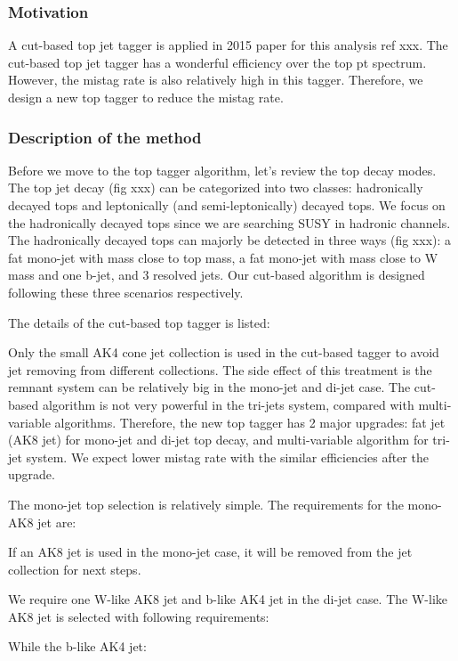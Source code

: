 \subsubsection{Motivation}
A cut-based top jet tagger is applied in 2015 paper for this analysis ref xxx. The cut-based top jet tagger has a wonderful efficiency over the top pt spectrum. However, the mistag rate is also relatively high in this tagger. Therefore, we design a new top tagger to reduce the mistag rate. 

\subsubsection{Description of the method}

Before we move to the top tagger algorithm, let’s review the top decay modes. The top jet decay (fig xxx) can be categorized into two classes: hadronically decayed tops and leptonically (and semi-leptonically) decayed tops. We focus on the hadronically decayed tops since we are searching SUSY in hadronic channels. The hadronically decayed tops can majorly be detected in three ways (fig xxx): a fat mono-jet with mass close to top mass, a fat mono-jet with mass close to W mass and one b-jet, and 3 resolved jets. Our cut-based algorithm is designed following these three scenarios respectively. 

The details of the cut-based top tagger is listed:

Only the small AK4 cone jet collection is used in the cut-based tagger to avoid jet removing from different collections. The side effect of this treatment is the remnant system can be relatively big in the mono-jet and di-jet case. The cut-based algorithm is not very powerful in the tri-jets system, compared with multi-variable algorithms. Therefore, the new top tagger has 2 major upgrades: fat jet (AK8 jet) for mono-jet and di-jet top decay, and multi-variable algorithm for tri-jet system. We expect lower mistag rate with the similar efficiencies after the upgrade. 

The mono-jet top selection is relatively simple. The requirements for the mono-AK8 jet are:


If an AK8 jet is used in the mono-jet case, it will be removed from the jet collection for next steps. 

We require one W-like AK8 jet and b-like AK4 jet in the di-jet case. The W-like AK8 jet is selected with following requirements:

While the b-like AK4 jet:

